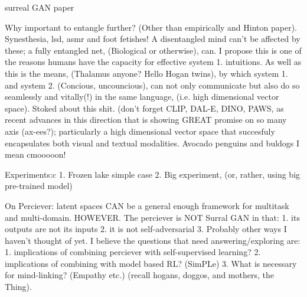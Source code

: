 surreal GAN paper

Why important to entangle further? (Other than empirically and Hinton paper). Synesthesia, lsd, asmr and foot fetishes! A disentangled mind can't be affected by these; a fully entangled net, (Biological or otherwise), can. I propose this is one of the reasons humans have the capacity for effective system 1. intuitions. As well as this is the means, (Thalamus anyone? Hello Hogan twins), by which system 1. and system 2. (Concious, uncouncious), can not only communicate but also do so seamlessly and vitally(!) in the same language, (i.e. high dimensional vector space). Stoked about this shit. (don't forget CLIP, DAL-E, DINO, PAWS, as recent advances in this direction that is showing GREAT promise on so many axis (ax-ees?); particularly a high dimensional vector space that succesfuly encapsulates both visual and textual modalities. Avocado penguins and buldogs I mean cmooooon! 

Experiments:c
1. Frozen lake simple case
2. Big experiment, (or, rather, using big pre-trained model)

On Perciever: latent spaces CAN be a general enough framework for multitask and multi-domain. HOWEVER. The perciever is NOT Surral GAN in that: 1. its outputs are not its inputs 2. it is not self-adversarial 3. Probably other ways I haven't thought of yet. 
I believe the questions that need answering/exploring are: 1. implications of combining perciever with self-supervised learning? 2. implications of combining with model based RL? (SimPLe) 3. What is necessary for mind-linking? (Empathy etc.) (recall hogans, doggos, and mothers, the Thing). 


